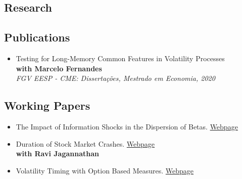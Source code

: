 \documentclass[a4paper,10pt]{article}
\begin{document}
\clearpage
\begin{samepage}
    \section{Research}
    \subsection{Publications}
    \begin{itemize}[label={}]
        \item Testing for Long-Memory Common Features in Volatility Processes \\
            \textbf{with Marcelo Fernandes} \\
            \textit{FGV EESP - CME: Dissertações, Mestrado em Economia, 2020}
    \end{itemize}
    \subsection{Working Papers}
    \begin{itemize}
        \item The Impact of Information Shocks in the Dispersion of Betas. \href{https://joseparreiras.github.io/projects/news-and-betas}{Webpage}
        \item Duration of Stock Market Crashes. \href{https://joseparreiras.github.io/projects/news-and-betas}{Webpage} \\
            \textbf{with Ravi Jagannathan}
        \item Volatility Timing with Option Based Measures. \href{https://joseparreiras.github.io/projects/news-and-betas}{Webpage}
    \end{itemize}
\end{samepage}

\end{document}
